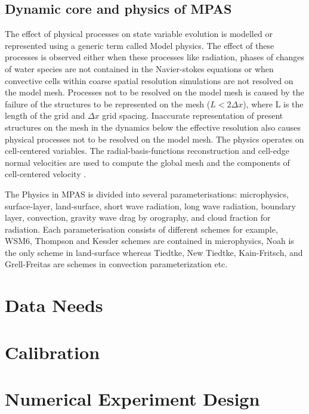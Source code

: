 \documentclass[9pt,a4paper]{article}
\begin{document}
		\subsection{Dynamic core and physics of MPAS}
		The effect of physical processes on state variable evolution is modelled or represented using a generic term called Model physics. The effect of these processes is observed either when these processes like radiation, phases of changes of water species are not contained in the Navier-stokes equations  or when convective cells within coarse spatial resolution simulations are not resolved on the model mesh. Processes not to be resolved on the model mesh is caused by the failure of the structures to be represented on the mesh ($L<2\Delta x$), where L is the length of the grid and $\Delta x$ grid spacing. Inaccurate representation of present structures on the mesh in the dynamics below the effective resolution also causes physical processes not to be resolved on the model mesh. The physics operates on cell-centered variables. The radial-basis-functions reconstruction and cell-edge normal velocities are used to compute the global mesh and the components of cell-centered velocity \citep{ATMOS}. 
		
		The Physics in MPAS is divided into several parameterisations: microphysics, surface-layer, land-surface, short wave radiation, long wave radiation, boundary layer, convection, gravity wave drag by orography, and cloud fraction for radiation. Each parameterisation consists of different schemes for example, WSM6, Thompson and Kessler schemes are contained in microphysics, Noah is the only scheme in  land-surface whereas Tiedtke, New Tiedtke, Kain-Fritsch, and Grell-Freitas are schemes in convection parameterization etc. 
		
		
			\section{Data Needs}
			
		
		
		
		
			
				\section{Calibration}
				
				
					\section{Numerical Experiment Design}
					
	
	
	
		
	
	
\end{document}
